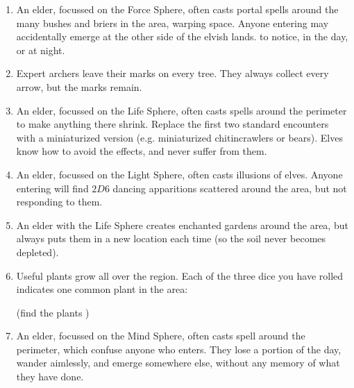 \begin{multicols}{2}
\begin{enumerate}
  \item
  An elder, focussed on the Force Sphere, often casts portal spells around the many bushes and briers in the area, warping space.
  Anyone entering may accidentally emerge at the other side of the elvish lands.
   to notice, \tn[7] in the day, or \tn[12] at night.
  \item
  Expert archers leave their marks on every tree.
  They always collect every arrow, but the marks remain.
  \item
  An elder, focussed on the Life Sphere, often casts spells around the perimeter to make anything there shrink.
  Replace the first two standard encounters with a miniaturized version (e.g. miniaturized chitincrawlers or bears).
  Elves know how to avoid the effects, and never suffer from them.
  \item
  An elder, focussed on the Light Sphere, often casts illusions of elves.
  Anyone entering will find $2D6$ dancing apparitions scattered around the area, but not responding to them.
  \item
  An elder with the Life Sphere creates enchanted gardens around the area, but always puts them in a new location each time (so the soil never becomes depleted).
  \item
  Useful plants grow all over the region.
  Each of the three dice you have rolled indicates one common plant in the area:
  (find the plants )
  \item
  An elder, focussed on the Mind Sphere, often casts spell around the perimeter, which confuse anyone who enters.
  They lose a portion of the day, wander aimlessly, and emerge somewhere else, without any memory of what they have done.


\end{enumerate}
\end{multicols}
